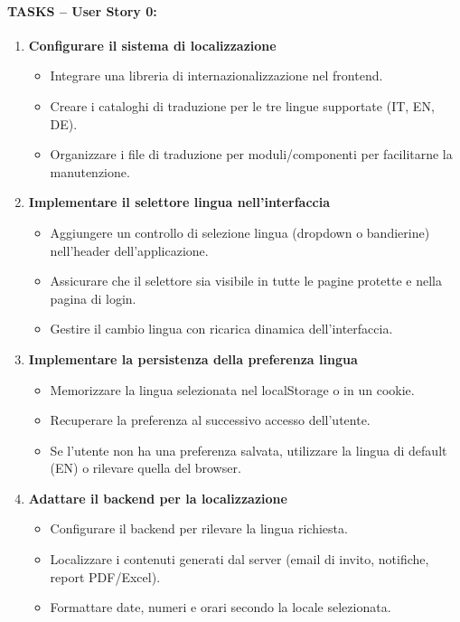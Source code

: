 \paragraph*{TASKS – User Story 0:}
\begin{enumerate}
    \item \textbf{Configurare il sistema di localizzazione}
    \begin{itemize}
        \item Integrare una libreria di internazionalizzazione nel frontend.
        \item Creare i cataloghi di traduzione per le tre lingue supportate (IT, EN, DE).
        \item Organizzare i file di traduzione per moduli/componenti per facilitarne la manutenzione.
    \end{itemize}

    \item \textbf{Implementare il selettore lingua nell'interfaccia}
    \begin{itemize}
        \item Aggiungere un controllo di selezione lingua (dropdown o bandierine) nell'header dell'applicazione.
        \item Assicurare che il selettore sia visibile in tutte le pagine protette e nella pagina di login.
        \item Gestire il cambio lingua con ricarica dinamica dell'interfaccia.
    \end{itemize}

    \item \textbf{Implementare la persistenza della preferenza lingua}
    \begin{itemize}
        \item Memorizzare la lingua selezionata nel localStorage o in un cookie.
        \item Recuperare la preferenza al successivo accesso dell'utente.
        \item Se l'utente non ha una preferenza salvata, utilizzare la lingua di default (EN) o rilevare quella del browser.
    \end{itemize}

    \item \textbf{Adattare il backend per la localizzazione}
    \begin{itemize}
        \item Configurare il backend per rilevare la lingua richiesta.
        \item Localizzare i contenuti generati dal server (email di invito, notifiche, report PDF/Excel).
        \item Formattare date, numeri e orari secondo la locale selezionata.
    \end{itemize}


\end{enumerate}
